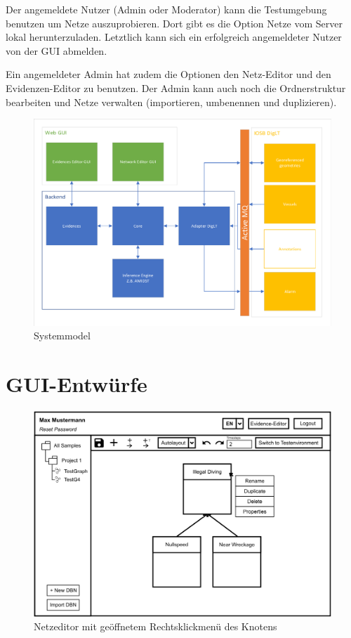 \documentclass[parskip=full,11pt,twoside]{scrartcl}
\begin{document}
Der angemeldete Nutzer (Admin oder Moderator) kann die Testumgebung benutzen um Netze auszuprobieren. Dort gibt es die Option Netze vom Server lokal herunterzuladen. Letztlich kann sich ein erfolgreich angemeldeter Nutzer von der GUI abmelden.

Ein angemeldeter Admin hat zudem die Optionen den Netz-Editor und den Evidenzen-Editor zu benutzen. Der Admin kann auch noch die Ordnerstruktur bearbeiten und Netze verwalten (importieren, umbenennen und duplizieren). 

\begin{figure}[ht!]
  \includegraphics[width=\linewidth]{image/PSE20191028.pdf}
  \caption{Systemmodel}
  \label{fig:Systemmodel}
\end{figure}


\pagebreak
\appendix
\section{GUI-Entwürfe}
\label{section:gui}

\begin{figure}[ht!]
    \includegraphics[width=\linewidth]{image/editor.png}
    \caption{Netzeditor mit geöffnetem Rechtsklickmenü des Knotens}
    \label{fig:neteditor}
\end{figure}
\end{document}
